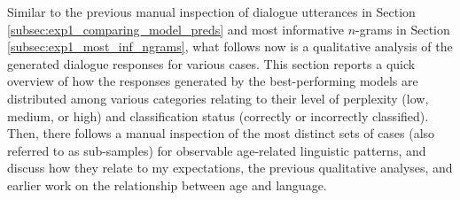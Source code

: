     
    
    
    



Similar to the previous manual inspection of dialogue utterances in Section \ref{subsec:exp1_comparing_model_preds} and most informative $n$-grams in Section \ref{subsec:exp1_most_inf_ngrams}, what follows now is a qualitative analysis of the generated dialogue responses for various cases.
This section reports a quick overview of how the responses generated by the best-performing models are distributed among various categories relating to their level of perplexity (low, medium, or high) and classification status (correctly or incorrectly classified).
Then, there follows a manual inspection of the most distinct sets of cases (also referred to as sub-samples) for observable age-related linguistic patterns, and discuss how they relate to my expectations, the previous qualitative analyses, and earlier work on the relationship between age and language.


